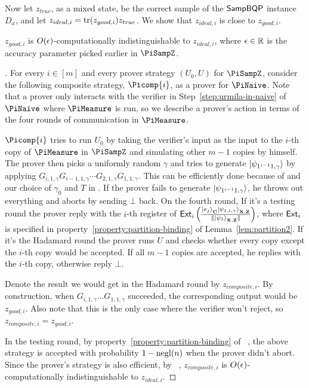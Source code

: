 Now let $z_{true}$, as a mixed state, be the correct sample of the $\operatorname{\mathsf{SampBQP}}$ instance $D_x$,
and let $z_{ideal, i}=\operatorname{tr}(z_{good, i})z_{true}$.
We show that $z_{ideal, i}$ is close to $z_{good, i}$.
\begin{lemma}
	\label{thm:zgood-zideal}
	$z_{good, i}$ is $O(\epsilon)$-computationally indistinguishable to $z_{ideal, i}$,
	where $\epsilon\in\mathbb{R}$ is the accuracy parameter picked earlier in $\PiSampZ$.
\end{lemma}
\begin{proof}[]
	For every $i\in [m]$ and every prover strategy $(U_0,U)$ for $\PiSampZ$, consider the following composite strategy, $\Picomp{i}$, as a prover for $\PiNaive$. Note that a prover only interacts with the verifier in Step~\ref{step:urmila-in-naive} of $\PiNaive$ where $\PiMeasure$ is run, so we describe a prover's action in terms of the four rounds of communication in $\PiMeasure$. 

	$\Picomp{i}$ tries to run $U_0$ by taking the verifier's input as the input to the $i$-th copy of $\PiMeasure$ in $\PiSampZ$ and simulating other $m-1$ copies by himself. The prover then picks a uniformly random $\gamma$ and  tries to generate $\ket{\psi_{1^{i-1}1,\gamma}}$ by applying $G_{i,1,\gamma}G_{i-1,1,\gamma} \cdots G_{2,1,\gamma}G_{1,1,\gamma}$. This can be efficiently done because of  and our choice of $\gamma_0$ and $T$ in . If the prover fails to generate $\ket{\psi_{1^{i-1}1,\gamma}}$, he throws out everything and aborts by sending $\bot$ back.   On the fourth round,  If it's a testing round the prover reply with the $i$-th register of $\mathsf{Ext}_i\left(\frac{\ket{e_j}_{\mathbf{C}}\ket{\psi_{1,i,\gamma}}_{\mathbf{X},\mathbf{Z}}}{\|\ket{\psi_1}_{\mathbf{X},\mathbf{Z}}\|}\right)$, where $\mathsf{Ext}_i$ is specified in property~\ref{property:partition-binding} of Lemma~\ref{lem:partition2}. If it's the Hadamard round  the prover  runs $U$ and checks whether every copy except the $i$-th copy would be accepted. If all $m-1$ copies are accepted, he replies with the $i$-th copy, otherwise reply $\bot$.
	
	Denote the result we would get in the Hadamard round by $z_{composite,i}$. By construction, when $G_{i,1,\gamma}\ldots G_{1,1,\gamma}$ succeeded, the corresponding output would be $z_{good,i}$. Also note that this is the only case where the verifier won't reject, so $z_{composite,i}=z_{good,i}$.

	In the testing round, by property~\ref{property:partition-binding} of ~, the above strategy is accepted with probability $1-\operatorname{negl}(n)$ when the prover didn't abort.
	Since the prover's strategy is also efficient, by ~,
	$z_{composite,i}$ is $O(\epsilon)$-computationally indistinguishable to $z_{ideal, i}$. 
\end{proof}

